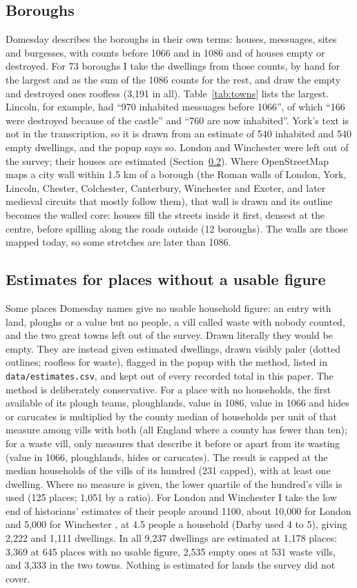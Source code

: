\documentclass[11pt,a4paper]{article}
\begin{document}
\subsection{Boroughs}
Domesday describes the boroughs in their own terms: houses, messuages, sites and burgesses, with counts before 1066 and in 1086 and of houses empty or destroyed. For 73 boroughs I take the dwellings from those counts, by hand for the largest and as the sum of the 1086 counts for the rest, and draw the empty and destroyed ones roofless (3,191 in all). Table~\ref{tab:towns} lists the largest. Lincoln, for example, had ``970 inhabited messuages before 1066'', of which ``166 were destroyed because of the castle'' and ``760 are now inhabited''. York's text is not in the transcription, so it is drawn from an estimate of 540 inhabited and 540 empty dwellings, and the popup says so. London and Winchester were left out of the survey; their houses are estimated (Section~\ref{sec:est}). Where OpenStreetMap maps a city wall within 1.5 km of a borough (the Roman walls of London, York, Lincoln, Chester, Colchester, Canterbury, Winchester and Exeter, and later medieval circuits that mostly follow them), that wall is drawn and its outline becomes the walled core: houses fill the streets inside it first, densest at the centre, before spilling along the roads outside (12 boroughs). The walls are those mapped today, so some stretches are later than 1086.

\subsection{Estimates for places without a usable figure}\label{sec:est}
Some places Domesday names give no usable household figure: an entry with land, ploughs or a value but no people, a vill called waste with nobody counted, and the two great towns left out of the survey. Drawn literally they would be empty. They are instead given estimated dwellings, drawn visibly paler (dotted outlines; roofless for waste), flagged in the popup with the method, listed in \texttt{data/estimates.csv}, and kept out of every recorded total in this paper. The method is deliberately conservative. For a place with no households, the first available of its plough teams, ploughlands, value in 1086, value in 1066 and hides or carucates is multiplied by the county median of households per unit of that measure among vills with both (all England where a county has fewer than ten); for a waste vill, only measures that describe it before or apart from its wasting (value in 1066, ploughlands, hides or carucates). The result is capped at the median households of the vills of its hundred (231 capped), with at least one dwelling. Where no measure is given, the lower quartile of the hundred's vills is used (125 places; 1,051 by a ratio). For London and Winchester I take the low end of historians' estimates of their people around 1100, about 10,000 for London \cite{brooke,keene} and 5,000 for Winchester \cite{biddle}, at 4.5 people a household (Darby used 4 to 5), giving 2,222 and 1,111 dwellings. In all 9,237 dwellings are estimated at 1,178 places: 3,369 at 645 places with no usable figure, 2,535 empty ones at 531 waste vills, and 3,333 in the two towns. Nothing is estimated for lands the survey did not cover.
\end{document}
